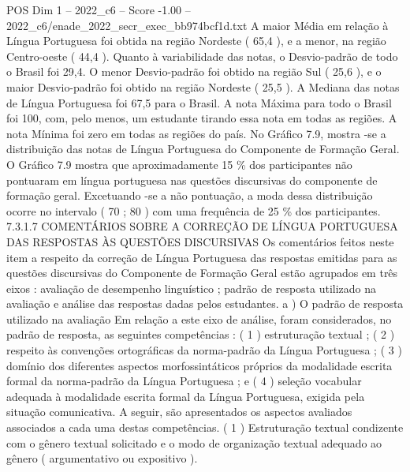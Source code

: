 \begin{textsample}{POS Dim 1 – 2022\_c6 – Score -1.00 – 2022\_c6/enade\_2022\_secr\_exec\_bb974bcf1d.txt}
A maior Média em relação à Língua Portuguesa foi obtida na região Nordeste ( 65,4 ), e a menor, na região Centro-oeste ( 44,4 ).
Quanto à variabilidade das notas, o Desvio-padrão de todo o Brasil foi 29,4.
O menor Desvio-padrão foi obtido na região Sul ( 25,6 ), e o maior Desvio-padrão foi obtido na região Nordeste ( 25,5 ).
A Mediana das notas de Língua Portuguesa foi 67,5 para o Brasil.
A nota Máxima para todo o Brasil foi 100, com, pelo menos, um estudante tirando essa nota em todas as regiões.
A nota Mínima foi zero em todas as regiões do país.
No Gráfico 7.9, mostra -se a distribuição das notas de Língua Portuguesa do Componente de Formação Geral.
O Gráfico 7.9 mostra que aproximadamente 15 \% dos participantes não pontuaram em língua portuguesa nas questões discursivas do componente de formação geral.
Excetuando -se a não pontuação, a moda dessa distribuição ocorre no intervalo ( 70 ; 80 ) com uma frequência de 25 \% dos participantes. 7.3.1.7 COMENTÁRIOS SOBRE A CORREÇÃO DE LÍNGUA PORTUGUESA DAS RESPOSTAS ÀS QUESTÕES DISCURSIVAS Os comentários feitos neste item a respeito da correção de Língua Portuguesa das respostas emitidas para as questões discursivas do Componente de Formação Geral estão agrupados em três eixos : avaliação de desempenho linguístico ; padrão de resposta utilizado na avaliação e análise das respostas dadas pelos estudantes. a ) O padrão de resposta utilizado na avaliação Em relação a este eixo de análise, foram considerados, no padrão de resposta, as seguintes competências : ( 1 ) estruturação textual ; ( 2 ) respeito às convenções ortográficas da norma-padrão da Língua Portuguesa ; ( 3 ) domínio dos diferentes aspectos morfossintáticos próprios da modalidade escrita formal da norma-padrão da Língua Portuguesa ; e ( 4 ) seleção vocabular adequada à modalidade escrita formal da Língua Portuguesa, exigida pela situação comunicativa.
A seguir, são apresentados os aspectos avaliados associados a cada uma destas competências. ( 1 ) Estruturação textual condizente com o gênero textual solicitado e o modo de organização textual adequado ao gênero ( argumentativo ou expositivo ).

\end{textsample}
